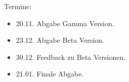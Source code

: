 \begin{flushleft}
    Termine:
    \begin{itemize}
    \item 20.11. Abgabe Gamma Version.
    \item 23.12. Abgabe Beta Version.
    \item 30.12. Feedback zu Beta Versionen.
    \item 21.01. Finale Abgabe.
    \end{itemize}
    
\end{flushleft}